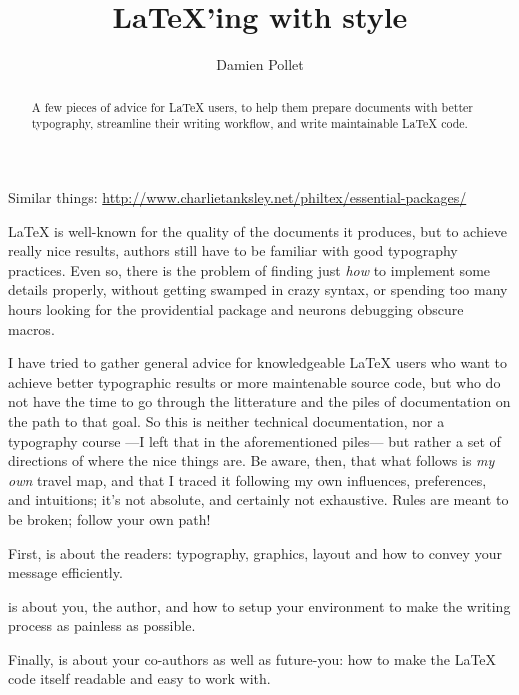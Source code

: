 \documentclass[a4paper,twoside,nofonts]{tufte-handout}
\title{\\LaTeX'ing with style}
\author{Damien Pollet}
\date{}
\begin{document}
\maketitle

\begin{abstract}
  A few pieces of advice for \LaTeX{} users, to help them prepare documents with better typography, streamline their writing workflow, and write maintainable \LaTeX{} code.
\end{abstract}
\begin{todoenv}
  \noindent Similar things:
  \url{http://www.charlietanksley.net/philtex/essential-packages/}
\end{todoenv}
\vfill

\begin{fullwidth}
  \begin{multicols}{2}
    \noindent
    \LaTeX{} is well-known for the quality of the documents it produces, but to achieve really nice results, authors still have to be familiar with good typography practices.
    Even so, there is the problem of finding just \emph{how} to implement some details properly, without getting swamped in crazy syntax, or spending too many hours looking for the providential package and neurons debugging obscure macros.
    
    I have tried to gather general advice for knowledgeable \LaTeX{} users who want to achieve better typographic results or more maintenable source code, but who do not have the time to go through the litterature and the piles of documentation on the path to that goal.
    So this is neither technical documentation, nor a typography course ---I left that in the aforementioned piles--- but rather a set of directions of where the nice things are.
    Be aware, then, that what follows is \emph{my own} travel map, and that I traced it following my own influences, preferences, and intuitions; it's not absolute, and certainly not exhaustive.
    Rules are meant to be broken; follow your own path!
  \end{multicols}
  \bigskip
  
  \begin{multicols}{3}
    \noindent
    First, \emph{} is about the readers: typography, graphics, layout and how to convey your message efficiently.
    
    \columnbreak\noindent
    \emph{} is about you, the author, and how to setup your environment to make the writing process as painless as possible.
    
    \columnbreak\noindent
    Finally, \emph{} is about your co-authors as well as future-you: how to make the \LaTeX{} code itself readable and easy to work with.
  \end{multicols}
\end{fullwidth}
\end{document}
